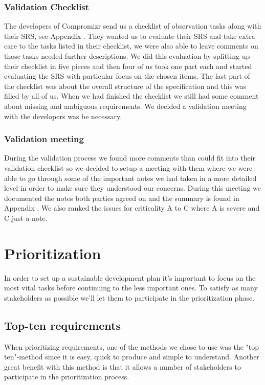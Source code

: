 \documentclass[10pt]{article}
\begin{document}
\subsubsection{Validation Checklist}
The developers of Compromizr send us a checklist of observation tasks along with their SRS, see Appendix \cite{CompromizrChecklist}. They wanted us to evaluate their SRS and take extra care to the tasks listed in their checklist, we were also able to leave comments on those tasks needed further descriptions. We did this evaluation by splitting up their checklist in five pieces and then four of us took one part each and started evaluating the SRS with particular focus on the chosen items. The last part of the checklist was about the overall structure of the specification and this was filled by all of us.
When we had finished the checklist we still had some comment about missing and ambiguous requirements. We decided a validation meeting with the developers was be necessary.

\subsubsection{Validation meeting}
During the validation process we found more comments than could fit into their validation checklist so we decided to setup a meeting with them where we were able to go through some of the important notes we had taken in a more detailed level in order to make sure they understood our concerns. During this meeting we documented the notes both parties agreed on and the summary is found in Appendix \cite{CompromizrValidationMeeting}. We also ranked the issues for criticality A to C where A is severe and C just a note.


\section{Prioritization}
In order to set up a sustainable development plan it's important to focus on the most vital tasks before continuing to the less important ones. To satisfy as many stakeholders as possible we'll let them to participate in the prioritization phase.

\subsection{Top-ten requirements}
When prioritizing requirements, one of the methods we chose to use was the "top ten"-method since it is easy, quick to produce and simple to understand. Another great benefit with this method is that it allows a number of stakeholders to participate in the prioritization process.
\end{document}
